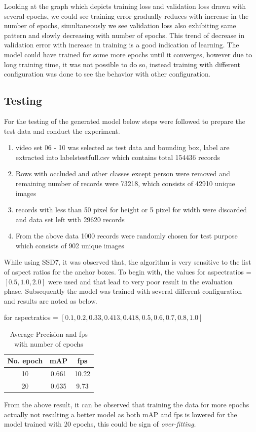 \newpara
Looking at the graph which depicts training loss and validation loss drawn with several epochs, we could see training error gradually reduces with increase in the number of epochs, simultaneously we see validation loss also exhibiting same pattern and slowly decreasing with number of epochs. This trend of decrease in validation error with increase in training is a good indication of learning. The model could have trained for some more epochs until it converges, however due to long training time, it was not possible to do so, instead training with different configuration was done to see the behavior with other configuration.

\subsection{Testing} 
For the testing of the generated model below steps were followed to prepare the test data and conduct the experiment.
\begin{enumerate}
	\item video set 06 - 10 was selected as test data and bounding box, label are extracted into labels\textunderscore test\textunderscore full.csv which contains total 154436 records
	\item Rows with occluded and other classes except person were removed and remaining number of records were 73218, which consists of 42910 unique images 
	\item records with less than 50 pixel for height or 5 pixel for width were discarded and data set left with 29620 records
	\item From the above data 1000 records were randomly chosen for test purpose which consists of 902 unique images
\end{enumerate}

\newpara
While using SSD7, it was observed that, the algorithm is very sensitive to the list of aspect ratios for the anchor boxes. To begin with, the values for aspect\textunderscore ratios = $[0.5, 1.0, 2.0]$ were used and that lead to very poor result in the evaluation phase. Subsequently the model was trained with several different configuration and results are noted as below.

for aspect\textunderscore ratios = $[0.1, 0.2, 0.33, 0.413, 0.418, 0.5, 0.6, 0.7, 0.8, 1.0]$
\begin{table}[H]
\begin{center}
 \begin{tabular}{||c c c||} 
 \hline
 No. epoch & mAP & fps\\ [0.8ex] 
 \hline\hline
 10 & 0.661 & 10.22\\ 
 \hline
 20  & 0.635 & 9.73 \\
\hline
\end{tabular}
\caption{Average Precision and fps with number of epochs}
\end{center}
\end{table}
From the above result, it can be observed that training the data for more epochs actually not resulting a better model as both mAP and fps is lowered for the model trained with 20 epochs, this could be sign of \textit{over-fitting.}

